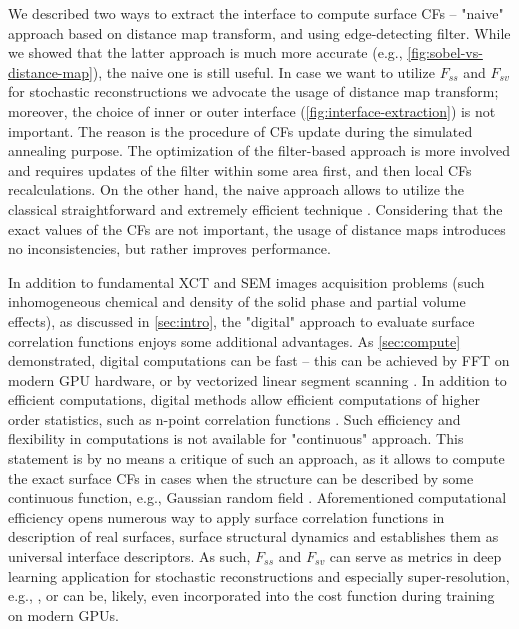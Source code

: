 \documentclass[reprint,amsmath,amssymb,aps,pre,showkeys,showpacs]{revtex4-1}
\begin{document}
We described two ways to extract the interface to compute surface CFs -- "naive"
approach based on distance map transform, and using edge-detecting filter. While
we showed that the latter approach is much more accurate (e.g.,
\cref{fig:sobel-vs-distance-map}), the naive one is still useful. In case we
want to utilize $F_{ss}$ and $F_{sv}$ for stochastic reconstructions
\cite{Y-T,JiaoPNAS,karsaninaPRL} we advocate the usage of distance map
transform; moreover, the choice of inner or outer interface
(\cref{fig:interface-extraction}) is not important. The reason is the procedure
of CFs update during the simulated annealing purpose. The optimization of the
filter-based approach is more involved and requires updates of the filter within
some area first, and then local CFs recalculations. On the other hand, the naive
approach allows to utilize the classical straightforward and extremely efficient
technique \cite{rozman2001}. Considering that the exact values of the CFs are
not important, the usage of distance maps introduces no inconsistencies, but
rather improves performance.

In addition to fundamental XCT and SEM images acquisition problems (such
inhomogeneous chemical and density of the solid phase and partial volume
effects), as discussed in \cref{sec:intro}, the "digital" approach to evaluate
surface correlation functions enjoys some additional advantages. As
\cref{sec:compute} demonstrated, digital computations can be fast -- this can be
achieved by FFT on modern GPU hardware, or by vectorized linear segment scanning
\cite{EPL1}. In addition to efficient computations, digital methods allow
efficient computations of higher order statistics, such as n-point correlation
functions \cite{malmir2018}. Such efficiency and flexibility in computations is
not available for "continuous" approach. This statement is by no means a
critique of such an approach, as it allows to compute the exact surface CFs in
cases when the structure can be described by some continuous function, e.g.,
Gaussian random field \cite{ma2018SS}. Aforementioned computational efficiency
opens numerous way to apply surface correlation  functions in description of
real surfaces, surface structural dynamics and establishes them as universal
interface descriptors. As such, $F_{ss}$ and $F_{sv}$ can serve as metrics in
deep learning application for stochastic reconstructions and especially
super-resolution, e.g., \cite{chen2020super,janssens2020,karimpouli2022}, or can
be, likely, even incorporated into the cost function during training on modern
GPUs.
\end{document}
